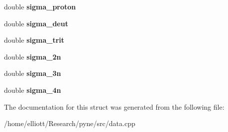 \begin{DoxyCompactItemize}
\item 
\hypertarget{structsimple__xs_aff5767a5644512bc20acdb7b6be11f6a}{double {\bfseries sigma\-\_\-proton}}\label{structsimple__xs_aff5767a5644512bc20acdb7b6be11f6a}

\item 
\hypertarget{structsimple__xs_a144a201fa75999fe72b1e7ff6cf599de}{double {\bfseries sigma\-\_\-deut}}\label{structsimple__xs_a144a201fa75999fe72b1e7ff6cf599de}

\item 
\hypertarget{structsimple__xs_ac94cd1b3c4d07c830484563268c9e3b4}{double {\bfseries sigma\-\_\-trit}}\label{structsimple__xs_ac94cd1b3c4d07c830484563268c9e3b4}

\item 
\hypertarget{structsimple__xs_a48428459c08bd8e7ca73ede3d5d1b12d}{double {\bfseries sigma\-\_\-2n}}\label{structsimple__xs_a48428459c08bd8e7ca73ede3d5d1b12d}

\item 
\hypertarget{structsimple__xs_a2d20b02fe8098c55466d12de065bfdee}{double {\bfseries sigma\-\_\-3n}}\label{structsimple__xs_a2d20b02fe8098c55466d12de065bfdee}

\item 
\hypertarget{structsimple__xs_a1c2a32a82a8f3e381d67b778c89c499e}{double {\bfseries sigma\-\_\-4n}}\label{structsimple__xs_a1c2a32a82a8f3e381d67b778c89c499e}

\end{DoxyCompactItemize}


The documentation for this struct was generated from the following file\-:\begin{DoxyCompactItemize}
\item 
/home/elliott/\-Research/pyne/src/data.\-cpp\end{DoxyCompactItemize}
